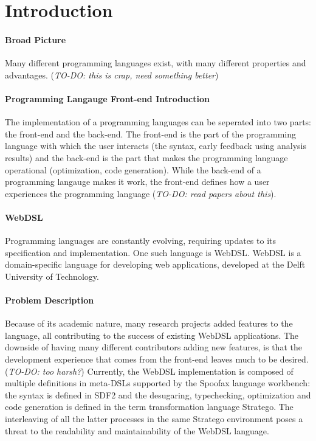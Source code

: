 
\chapter{\label{chap:introduction}Introduction}

  \subsubsection{Broad Picture}
  Many different programming languages exist, with many different properties and advantages. (\emph{TO-DO: this is crap, need something better})

  \subsubsection{Programming Langauge Front-end Introduction}
  The implementation of a programming languages can be seperated into two parts: the front-end and the back-end. The front-end is the part of the programming language with which the user interacts (the syntax, early feedback using analysis results) and the back-end is the part that makes the programming language operational (optimization, code generation). While the back-end of a programming langauge makes it work, the front-end defines how a user experiences the programming language (\emph{TO-DO: read papers about this}).

  \subsubsection{WebDSL}
  Programming languages are constantly evolving, requiring updates to its specification and implementation. One such language is WebDSL. WebDSL is a domain-specific language for developing web applications, developed at the Delft University of Technology.

  \subsubsection{Problem Description}
  Because of its academic nature, many research projects added features to the language, all contributing to the success of existing WebDSL applications. The downside of having many different contributors adding new features, is that the development experience that comes from the front-end leaves much to be desired. (\emph{TO-DO: too harsh?}) Currently, the WebDSL implementation is composed of multiple definitions in meta-DSLs supported by the Spoofax language workbench: the syntax is defined in SDF2 and the desugaring, typechecking, optimization and code generation is defined in the term transformation language Stratego. The interleaving of all the latter processes in the same Stratego environment poses a threat to the readability and maintainability of the WebDSL language.

